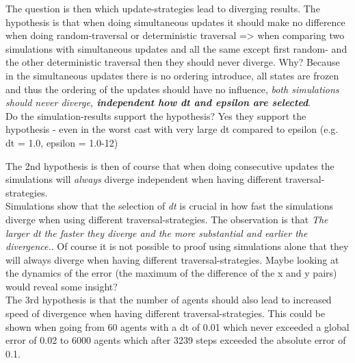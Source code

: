 The question is then which update-strategies lead to diverging results. The hypothesis is that when doing simultaneous updates it should make no difference when doing random-traversal or deterministic traversal => when comparing two simulations with simultaneous updates and all the same except first random- and the other deterministic traversal then they should never diverge. Why? Because in the simultaneous updates there is no ordering introduce, all states are frozen and thus the ordering of the updates should have no influence, \textit{both simulations should never diverge, \textbf{independent how dt and epsilon are selected}}. \\
Do the simulation-results support the hypothesis? Yes they support the hypothesis - even in the worst cast with very large dt compared to epsilon (e.g. dt = 1.0, epsilon = 1.0-12)

The 2nd hypothesis is then of course that when doing consecutive updates the simulations will \textit{always} diverge independent when having different traversal-strategies. \\
Simulations show that the selection of \textit{dt} is crucial in how fast the simulations diverge when using different traversal-strategies. The observation is that \textit{The larger dt the faster they diverge and the more substantial and earlier the divergence.}. Of course it is not possible to proof using simulations alone that they will always diverge when having different traversal-strategies. Maybe looking at the dynamics of the error (the maximum of the difference of the x and y pairs) would reveal some insight? \\

The 3rd hypothesis is that the number of agents should also lead to increased speed of divergence when having different traversal-strategies. This could be shown when going from 60 agents with a dt of 0.01 which never exceeded a global error of 0.02 to 6000 agents which after 3239 steps exceeded the absolute error of 0.1.
